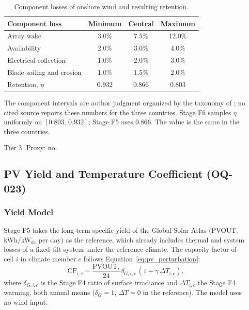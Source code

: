 \begin{table}[htbp]
    \centering
    \caption{Component losses of onshore wind and resulting retention.}
    \label{tab:g1_wind_losses}
    \small
    \begin{tabular}{lccc}
        \toprule
        Component loss & Minimum & Central & Maximum \\
        \midrule
        Array wake                & 3.0\% & 7.5\% & 12.0\% \\
        Availability              & 2.0\% & 3.0\% & 4.0\%  \\
        Electrical collection     & 1.0\% & 2.0\% & 3.0\%  \\
        Blade soiling and erosion & 1.0\% & 1.5\% & 2.0\%  \\
        \midrule
        Retention, $\eta$ & 0.932 & 0.866 & 0.803 \\
        \bottomrule
    \end{tabular}
\end{table}

The component intervals are author judgment organized by the taxonomy of
\cite{leefields2021}; no cited source reports these numbers for the three
countries. Stage F6 samples $\eta$ uniformly on $[0.803,\,0.932]$; Stage
F5 uses 0.866. The value is the same in the three countries.

Tier 3. Proxy: no.

\subsection{PV Yield and Temperature Coefficient (OQ-023)}
\label{subsec:g1_pv_thermal}

\subsubsection{Yield Model}

Stage F5 takes the long-term specific yield of the Global Solar Atlas
(PVOUT, kWh/kW$_{\mathrm{dc}}$ per day) \cite{esmap2019gsa} as the reference, which already
includes thermal and system losses of a fixed-tilt system under the
reference climate. The capacity factor of cell $i$ in climate member $c$
follows Equation~\ref{eq:pv_perturbation}:
\begin{equation}
    \mathrm{CF}_{i,c} = \frac{\mathrm{PVOUT}_i}{24}\,
      \delta_{G,i,c}\,(1+\gamma\,\Delta T_{i,c}),
    \label{eq:g1_pv_cf}
\end{equation}
where $\delta_{G,i,c}$ is the Stage F4 ratio of surface irradiance and
$\Delta T_{i,c}$ the Stage F4 warming, both annual means
($\delta_G=1$, $\Delta T=0$ in the reference). The model uses no wind
input.

